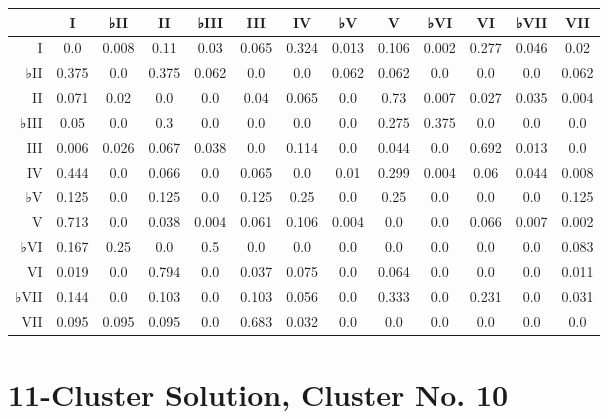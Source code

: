 \begin{table}[htbp]
\begin{minipage}{\linewidth}
\setlength{\tymax}{0.5\linewidth}
\centering
\small
\begin{tabulary}{\textwidth}{@{}RCCCCCCCCCCCC@{}} \toprule
&I&♭II&II&♭III&III&IV&♭V&V&♭VI&VI&♭VII&VII\\
\midrule
I&0.0&0.008&0.11&0.03&0.065&0.324&0.013&0.106&0.002&0.277&0.046&0.02\\
♭II&0.375&0.0&0.375&0.062&0.0&0.0&0.062&0.062&0.0&0.0&0.0&0.062\\
II&0.071&0.02&0.0&0.0&0.04&0.065&0.0&0.73&0.007&0.027&0.035&0.004\\
♭III&0.05&0.0&0.3&0.0&0.0&0.0&0.0&0.275&0.375&0.0&0.0&0.0\\
III&0.006&0.026&0.067&0.038&0.0&0.114&0.0&0.044&0.0&0.692&0.013&0.0\\
IV&0.444&0.0&0.066&0.0&0.065&0.0&0.01&0.299&0.004&0.06&0.044&0.008\\
♭V&0.125&0.0&0.125&0.0&0.125&0.25&0.0&0.25&0.0&0.0&0.0&0.125\\
V&0.713&0.0&0.038&0.004&0.061&0.106&0.004&0.0&0.0&0.066&0.007&0.002\\
♭VI&0.167&0.25&0.0&0.5&0.0&0.0&0.0&0.0&0.0&0.0&0.0&0.083\\
VI&0.019&0.0&0.794&0.0&0.037&0.075&0.0&0.064&0.0&0.0&0.0&0.011\\
♭VII&0.144&0.0&0.103&0.0&0.103&0.056&0.0&0.333&0.0&0.231&0.0&0.031\\
VII&0.095&0.095&0.095&0.0&0.683&0.032&0.0&0.0&0.0&0.0&0.0&0.0\\

\bottomrule

\end{tabulary}
\end{minipage}
\end{table}

\section{11-Cluster Solution, Cluster No. 10}
\label{11-clustersolutionclusterno.10}

